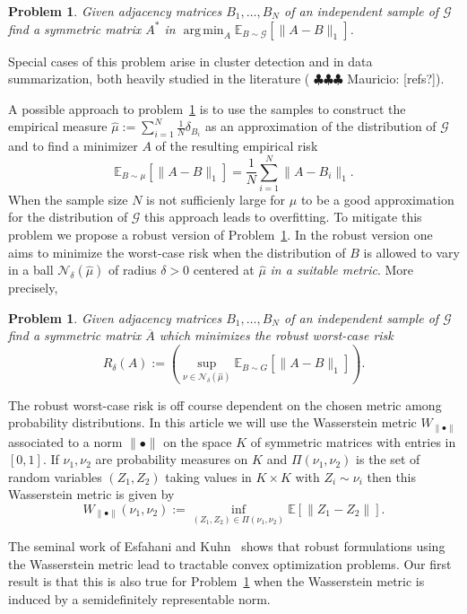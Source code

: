 \documentclass[12pt]{amsart}
\newtheorem{problem}[lemma]{Problem}
\theoremstyle{remark}
\DeclareMathOperator*{\argmin}{arg\,min}
\newcommand{\EE}{\mathbb{E}}
\newcommand{\grG}{{\mathcal{G}}}
\newcommand{\mv}[1]{{\color{red} \sf $\clubsuit\clubsuit\clubsuit$ Mauricio: [#1]}}
\begin{document}
\begin{problem}\label{Prob} Given adjacency matrices $B_1,\dots, B_N$ of an independent sample of $\grG$ find a symmetric matrix $A^*$ in $\argmin_A \EE_{B\sim \grG}[\|A-B\|_1]$. 
\end{problem}

Special cases of this problem arise in cluster detection and in data summarization, both heavily studied in the literature (\mv{refs?}).

A possible approach to problem~\ref{Prob} is to use the samples to construct the empirical measure $\hat{\mu}:=\sum_{i=1}^N \frac{1}{N}\delta_{B_i}$ as an approximation of the distribution of $\grG$ and to find a minimizer $A$ of the resulting empirical risk
\[ \EE_{B\sim \mu}[\|A-B\|_1]=\frac{1}{N}\sum_{i=1}^N \|A-B_i\|_1.\]
When the sample size $N$ is not sufficienly large for $\hat{\mu}$ to be a good approximation for the distribution of $\grG$ this approach leads to overfitting. To mitigate this problem we propose a robust version of Problem~\ref{Prob}. In the robust version one aims to minimize the worst-case risk when the distribution of $B$ is allowed to vary in a ball $\mathcal{N}_{\delta}(\hat{\mu})$ of radius $\delta>0$ centered at $\hat{\mu}$ {\it in a suitable metric}. More precisely,

\begin{problem}\label{ProbRobusto} Given adjacency matrices $B_1,\dots, B_N$ of an independent sample of $\grG$ find a symmetric matrix $\overline{A}$ which minimizes the robust worst-case risk 
\[R_{\delta}(A):=\left(\sup_{\nu\in \mathcal{N}_{\delta}(\hat{\mu})} \EE_{B\sim G}[\|A-B\|_1]\right).\] 
\end{problem}
The robust worst-case risk is off course dependent on the chosen metric among probability distributions. In this article we will use the Wasserstein metric $W_{\|\bullet\|}$ associated to a norm $\|\bullet\|$ on the space $K$ of symmetric matrices with entries in $[0,1]$. If $\nu_1,\nu_2$ are probability measures on $K$ and $\Pi(\nu_1,\nu_2)$ is the set of random variables $(Z_1,Z_2)$ taking values in $K\times K$  with $Z_i\sim \nu_i$ then this Wasserstein metric is given by 
\[ W_{\|\bullet\|}(\nu_1,\nu_2):=\inf_{(Z_1,Z_2)\in \Pi(\nu_1,\nu_2)} \EE[\|Z_1-Z_2\|].\]

The seminal work of Esfahani and Kuhn~\cite{EsfahaniKuhn} shows that robust formulations using the Wasserstein metric lead to tractable convex optimization problems. Our first result is that this is also true for Problem~\ref{ProbRobusto} when the Wasserstein metric is induced by a semidefinitely representable norm.
\end{document}
